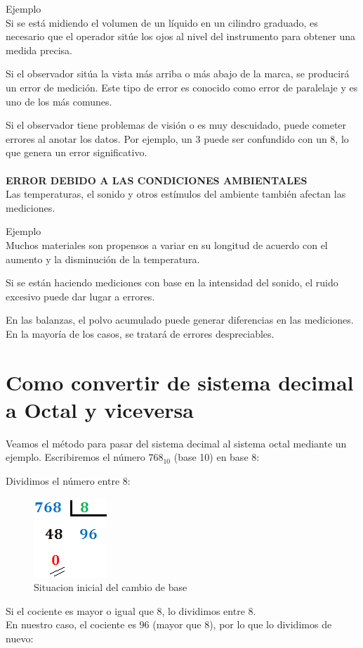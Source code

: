 \documentclass{article}
\begin{document}
\begin{multicols}{2}
Ejemplo
\\
Si se está midiendo el volumen de un líquido en un cilindro graduado, es necesario que el operador sitúe los ojos al nivel del instrumento para obtener una medida precisa.

Si el observador sitúa la vista más arriba o más abajo de la marca, se producirá un error de medición. Este tipo de error es conocido como error de paralelaje y es uno de los más comunes.

Si el observador tiene problemas de visión o es muy descuidado, puede cometer errores al anotar los datos. Por ejemplo, un 3 puede ser confundido con un 8, lo que genera un error significativo.
\\
\\
\textbf{ERROR DEBIDO A LAS CONDICIONES AMBIENTALES}
\\
Las temperaturas, el sonido y otros estímulos del ambiente también afectan las mediciones.

Ejemplo
\\
Muchos materiales son propensos a variar en su longitud de acuerdo con el aumento y la disminución de la temperatura.

Si se están haciendo mediciones con base en la intensidad del sonido, el ruido excesivo puede dar lugar a errores.

En las balanzas, el polvo acumulado puede generar diferencias en las mediciones. En la mayoría de los casos, se tratará de errores despreciables.
\section{Como convertir de sistema decimal a Octal y viceversa}
\label{sec:Como}
Veamos el método para pasar del sistema decimal al sistema octal mediante un ejemplo. Escribiremos el número 
$768_{10}$ (base 10) en base 8:

Dividimos el número entre 8:
\begin{figure}[H]	
\centering
\includegraphics[scale=1]{Octal-1.png}
\caption{Situacion inicial del cambio de base}
	\end{figure}

Si el cociente es mayor o igual que 8, lo dividimos entre 8.
\\
En nuestro caso, el cociente es 96 (mayor que 8), por lo que lo dividimos de nuevo:


\end{multicols}
\end{document}
